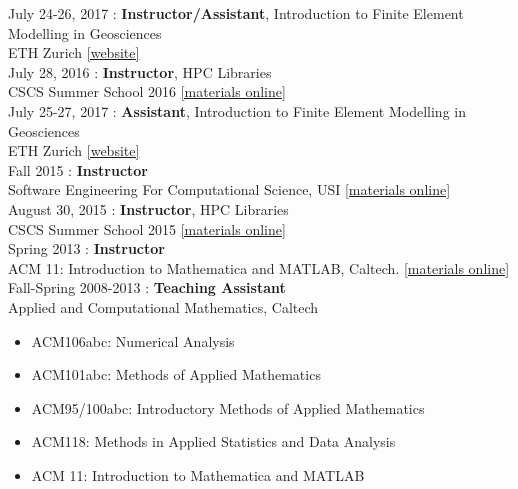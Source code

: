 \documentclass[12pt]{article}
\begin{document}
\noindent July 24-26, 2017 : \textbf{Instructor/Assistant}, Introduction to Finite Element Modelling in Geosciences \\
ETH Zurich
\href{https://jupiter2.ethz.ch/~gfdteaching/femblockcourse/2017/}{[website]}\\

\noindent July 28, 2016 : \textbf{Instructor}, HPC Libraries \\
CSCS Summer School 2016
\href{https://github.com/eth-cscs/SummerSchool2016}{[materials online]}\\

\noindent July 25-27, 2017 : \textbf{Assistant}, Introduction to Finite Element Modelling in Geosciences \\
ETH Zurich
\href{http://jupiter.ethz.ch/~gfdteaching/femblockcourse/2016/}{[website]}\\

\noindent Fall 2015 : \textbf{Instructor} \\
Software Engineering For Computational Science, USI
\href{https://bitbucket.org/psanan/sefcs2015}{[materials online]}\\

\noindent August 30, 2015 : \textbf{Instructor}, HPC Libraries \\
CSCS Summer School 2015
\href{https://github.com/eth-cscs/SummerSchool2015/tree/master/libraries}{[materials online]}\\

\noindent Spring 2013 : \textbf{Instructor}\\
ACM 11: Introduction to Mathematica and MATLAB, Caltech.
\href{https://bitbucket.org/psanan/introduction-to-matlab-and-mathematica}{[materials online]}\\

\noindent Fall-Spring 2008-2013 : \textbf{Teaching Assistant}\\
Applied and Computational Mathematics, Caltech
\begin{itemize} \itemsep0em
\item ACM106abc: Numerical Analysis
\item ACM101abc: Methods of Applied Mathematics
\item ACM95/100abc: Introductory Methods of Applied Mathematics
\item ACM118: Methods in Applied Statistics and Data Analysis
\item ACM 11: Introduction to Mathematica and MATLAB
\end{itemize}
\end{document}
